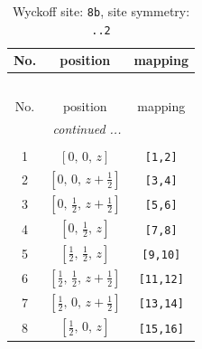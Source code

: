 \documentclass[fleqn,8pt]{jsarticle}
\begin{document}
\begin{longtable}{ccc}
\caption{Wyckoff site: {\tt 8b}, site symmetry: {\tt ..2}}
 \\
 \hline \hline
No. & position & mapping \\ \hline \endfirsthead

\multicolumn{2}{l}{\tablename\ \thetable{}} \\
 \hline \hline
No. & position & mapping \\ \hline \endhead

 \hline \hline
\multicolumn{2}{r}{\footnotesize\it continued ...} \\ \endfoot

 \hline \hline
\multicolumn{2}{r}{} \\ \endlastfoot

1 & $\left[ 0,\, 0,\, z \right]$ & {\tt [1,2]} \\ \hline
2 & $\left[ 0,\, 0,\, z + \frac{1}{2} \right]$ & {\tt [3,4]} \\ \hline
3 & $\left[ 0,\, \frac{1}{2},\, z + \frac{1}{2} \right]$ & {\tt [5,6]} \\ \hline
4 & $\left[ 0,\, \frac{1}{2},\, z \right]$ & {\tt [7,8]} \\ \hline
5 & $\left[ \frac{1}{2},\, \frac{1}{2},\, z \right]$ & {\tt [9,10]} \\ \hline
6 & $\left[ \frac{1}{2},\, \frac{1}{2},\, z + \frac{1}{2} \right]$ & {\tt [11,12]} \\ \hline
7 & $\left[ \frac{1}{2},\, 0,\, z + \frac{1}{2} \right]$ & {\tt [13,14]} \\ \hline
8 & $\left[ \frac{1}{2},\, 0,\, z \right]$ & {\tt [15,16]} \\
\end{longtable}
\renewcommand{\arraystretch}{1.2}
\end{document}
